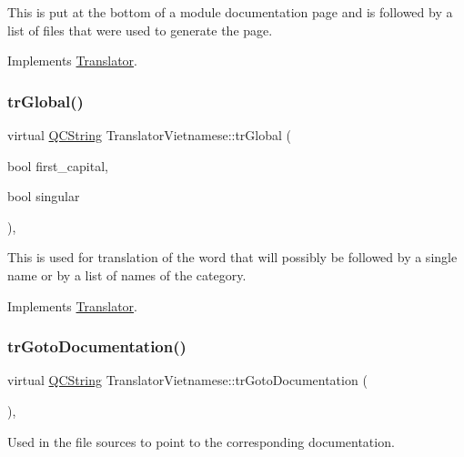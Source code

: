 This is put at the bottom of a module documentation page and is followed by a list of files that were used to generate the page. 

Implements \mbox{\hyperlink{class_translator}{Translator}}.

\mbox{\label{class_translator_vietnamese_a4ca8551757adc2434f88cd759228deeb}} 
\subsubsection{\texorpdfstring{trGlobal()}{trGlobal()}}
{\footnotesize\ttfamily virtual \mbox{\hyperlink{class_q_c_string}{Q\+C\+String}} Translator\+Vietnamese\+::tr\+Global (\begin{DoxyParamCaption}\item[{bool}]{first\+\_\+capital,  }\item[{bool}]{singular }\end{DoxyParamCaption})\hspace{0.3cm}{\ttfamily [inline]}, {\ttfamily [virtual]}}

This is used for translation of the word that will possibly be followed by a single name or by a list of names of the category. 

Implements \mbox{\hyperlink{class_translator}{Translator}}.

\mbox{\label{class_translator_vietnamese_a96368961702c829f0c3d97a35e6ead55}} 
\subsubsection{\texorpdfstring{trGotoDocumentation()}{trGotoDocumentation()}}
{\footnotesize\ttfamily virtual \mbox{\hyperlink{class_q_c_string}{Q\+C\+String}} Translator\+Vietnamese\+::tr\+Goto\+Documentation (\begin{DoxyParamCaption}{ }\end{DoxyParamCaption})\hspace{0.3cm}{\ttfamily [inline]}, {\ttfamily [virtual]}}

Used in the file sources to point to the corresponding documentation. 

